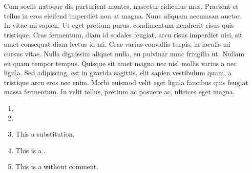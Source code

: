 Cum sociis natoque
 dis
parturient montes, nascetur ridiculus mus. Praesent et tellus in eros
eleifend imperdiet
non at magna. Nunc aliquam accumsan auctor. In vitae mi sapien. Ut eget
pretium purus.
 condimentum
hendrerit risus quis tristique. Cras fermentum, diam id sodales feugiat,
arcu risus imperdiet nisi, sit amet consequat diam lectus id mi. Cras
varius convallis turpis, in iaculis mi cursus vitae. Nulla dignissim
aliquet nulla, eu pulvinar nunc fringilla ut. Nullam
 eu quam tempor tempus.
Quisque sit amet magna nec nisl mollis varius a nec ligula. Sed
adipiscing, est in gravida sagittis, elit sapien vestibulum quam, a
tristique arcu eros nec enim. Morbi euismod velit
eget ligula faucibus quis feugiat massa fermentum. In velit tellus,
pretium ac posuere ac, ultrices eget magna.

\begin{enumerate}
\def\labelenumi{\arabic{enumi}.}
\item
\item
\item
  This  a substitution.
\item
  This is a
  .
\item
  This is a  without comment.
\end{enumerate}